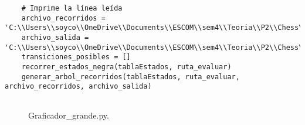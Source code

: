 \begin{enumerate}
\begin{lstlisting}
    # Imprime la línea leída
    archivo_recorridos = 'C:\\Users\\soyco\\OneDrive\\Documents\\ESCOM\\sem4\\Teoria\\P2\\Chess\\output\\recorridos_negra.txt'
    archivo_salida = 'C:\\Users\\soyco\\OneDrive\\Documents\\ESCOM\\sem4\\Teoria\\P2\\Chess\\output\\arbol_negra.dot'
    transiciones_posibles = []
    recorrer_estados_negra(tablaEstados, ruta_evaluar)
    generar_arbol_recorridos(tablaEstados, ruta_evaluar, archivo_recorridos, archivo_salida)
    

\end{lstlisting}
\begin{figure}[h]
\caption{Graficador_grande.py.}
\label{fig:imagen}
\end{figure}
 \end{enumerate}